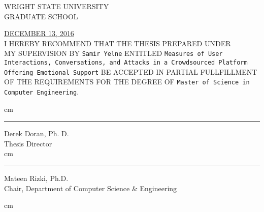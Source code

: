 \clearpage\thispagestyle{empty}


\begin{center}
\singlespacing
WRIGHT STATE UNIVERSITY \\

GRADUATE SCHOOL\\
\end{center}

\singlespacing

\hfill
\underline{DECEMBER 13, 2016}\\			%


I HEREBY RECOMMEND THAT THE THESIS PREPARED UNDER 
\\MY SUPERVISION  BY {\tt Samir Yelne} ENTITLED {\tt Measures of User Interactions, Conversations, and Attacks in a Crowdsourced Platform Offering Emotional Support} BE ACCEPTED IN PARTIAL FULLFILLMENT OF THE REQUIREMENTS FOR THE DEGREE OF  {\tt Master of Science in Computer Engineering}.\\

\hfill
\begin{minipage}{7cm}
\begin{center}
\singlespacing
{} cm\hrule\par\vskip 2mm
Derek Doran, Ph. D.\\	%
Thesis Director\\
 cm\hrule\par\vskip 2mm
Mateen Rizki, Ph.D.\\
Chair, Department of Computer Science \& Engineering\\
\end{center}
\end{minipage}

\par{} cm

